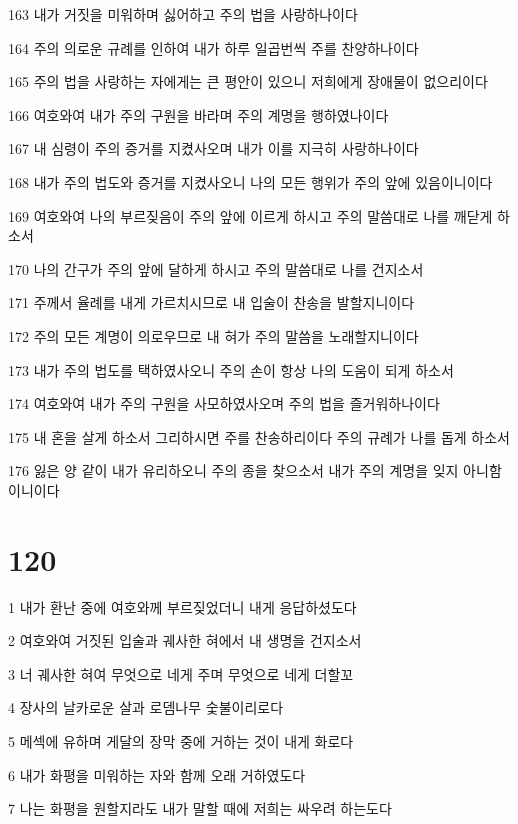 \par 163 내가 거짓을 미워하며 싫어하고 주의 법을 사랑하나이다
\par 164 주의 의로운 규례를 인하여 내가 하루 일곱번씩 주를 찬양하나이다
\par 165 주의 법을 사랑하는 자에게는 큰 평안이 있으니 저희에게 장애물이 없으리이다
\par 166 여호와여 내가 주의 구원을 바라며 주의 계명을 행하였나이다
\par 167 내 심령이 주의 증거를 지켰사오며 내가 이를 지극히 사랑하나이다
\par 168 내가 주의 법도와 증거를 지켰사오니 나의 모든 행위가 주의 앞에 있음이니이다
\par 169 여호와여 나의 부르짖음이 주의 앞에 이르게 하시고 주의 말씀대로 나를 깨닫게 하소서
\par 170 나의 간구가 주의 앞에 달하게 하시고 주의 말씀대로 나를 건지소서
\par 171 주께서 율례를 내게 가르치시므로 내 입술이 찬송을 발할지니이다
\par 172 주의 모든 계명이 의로우므로 내 혀가 주의 말씀을 노래할지니이다
\par 173 내가 주의 법도를 택하였사오니 주의 손이 항상 나의 도움이 되게 하소서
\par 174 여호와여 내가 주의 구원을 사모하였사오며 주의 법을 즐거워하나이다
\par 175 내 혼을 살게 하소서 그리하시면 주를 찬송하리이다 주의 규례가 나를 돕게 하소서
\par 176 잃은 양 같이 내가 유리하오니 주의 종을 찾으소서 내가 주의 계명을 잊지 아니함이니이다

\chapter{120}

\par 1 내가 환난 중에 여호와께 부르짖었더니 내게 응답하셨도다
\par 2 여호와여 거짓된 입술과 궤사한 혀에서 내 생명을 건지소서
\par 3 너 궤사한 혀여 무엇으로 네게 주며 무엇으로 네게 더할꼬
\par 4 장사의 날카로운 살과 로뎀나무 숯불이리로다
\par 5 메섹에 유하며 게달의 장막 중에 거하는 것이 내게 화로다
\par 6 내가 화평을 미워하는 자와 함께 오래 거하였도다
\par 7 나는 화평을 원할지라도 내가 말할 때에 저희는 싸우려 하는도다

